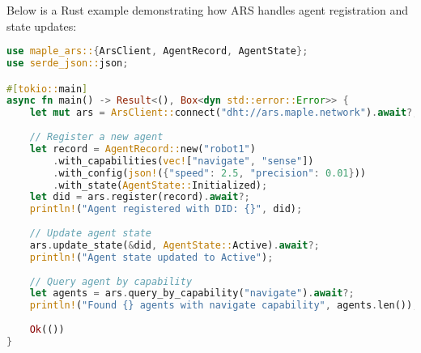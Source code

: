 \documentclass[a4paper,11pt]{article}
\begin{document}
Below is a Rust example demonstrating how ARS handles agent registration and state updates:
\begin{lstlisting}[language=Rust, caption={Rust ARS Example}, label={lst:ars-register}]
use maple_ars::{ArsClient, AgentRecord, AgentState};
use serde_json::json;

#[tokio::main]
async fn main() -> Result<(), Box<dyn std::error::Error>> {
    let mut ars = ArsClient::connect("dht://ars.maple.network").await?;
    
    // Register a new agent
    let record = AgentRecord::new("robot1")
        .with_capabilities(vec!["navigate", "sense"])
        .with_config(json!({"speed": 2.5, "precision": 0.01}))
        .with_state(AgentState::Initialized);
    let did = ars.register(record).await?;
    println!("Agent registered with DID: {}", did);
    
    // Update agent state
    ars.update_state(&did, AgentState::Active).await?;
    println!("Agent state updated to Active");
    
    // Query agent by capability
    let agents = ars.query_by_capability("navigate").await?;
    println!("Found {} agents with navigate capability", agents.len());
    
    Ok(())
}
\end{lstlisting}
\vspace{0.5cm}
\end{document}
